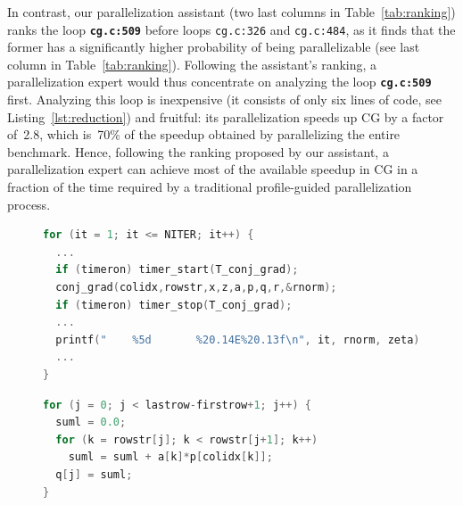 In contrast, our parallelization assistant (two last columns in
Table~\ref{tab:ranking}) ranks the loop \textbf{\texttt{cg.c:509}} before
loops \texttt{cg.c:326} and \texttt{cg.c:484}, as it finds that the former has a
significantly higher probability of being parallelizable (see last column in
Table~\ref{tab:ranking}).
%
Following the assistant's ranking, a parallelization expert would thus
concentrate on analyzing the loop \textbf{\texttt{cg.c:509}} first.
%
Analyzing this loop is inexpensive (it consists of only six lines of code, see
Listing~\ref{lst:reduction}) and fruitful: its parallelization speeds up CG by a
factor of~2.8, which is~70\% of the speedup obtained by parallelizing the entire
benchmark.
%
Hence, following the ranking proposed by our assistant, a parallelization expert
can achieve most of the available speedup in CG in a fraction of the time
required by a traditional profile-guided parallelization process.
\begin{figure}[t]
\begin{lstlisting}[caption={\texttt{cg.c:326}. Longest running loop in CG. The loop cannot be parallelized due to
inter-iteration dependences and side effects caused by system calls.},label={lst:main_iter},language=C]
for (it = 1; it <= NITER; it++) {
  ...
  if (timeron) timer_start(T_conj_grad);
  conj_grad(colidx,rowstr,x,z,a,p,q,r,&rnorm);
  if (timeron) timer_stop(T_conj_grad);
  ...
  printf("    %5d       %20.14E%20.13f\n", it, rnorm, zeta);
  ...
}
\end{lstlisting}
\begin{lstlisting}[caption={\textbf{\texttt{cg.c:509}}. Longest running loop in CG among those \emph{that can be parallelized}.},label={lst:reduction},language=C]
for (j = 0; j < lastrow-firstrow+1; j++) {
  suml = 0.0;
  for (k = rowstr[j]; k < rowstr[j+1]; k++)
    suml = suml + a[k]*p[colidx[k]];
  q[j] = suml;
}
\end{lstlisting}
\end{figure}
